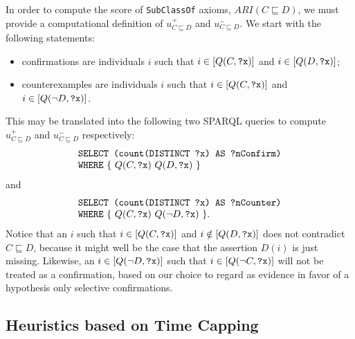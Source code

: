\documentclass{llncs}
\begin{document}
In order to compute the score of \texttt{SubClassOf} axioms, $ARI(C \sqsubseteq D)$, we must provide a computational definition of $u^+_{C \sqsubseteq D}$ and $u^-_{C \sqsubseteq D}$. We start with the following statements:
\begin{itemize}
\item confirmations are individuals $i$ such that
  $i \in [Q(C, \mbox{\tt ?x})]$ and $i \in [Q(D, \mbox{\tt ?x})]$;
\item counterexamples are individuals $i$ such that
  $i \in [Q(C, \mbox{\tt ?x})]$ and $i \in [Q(\neg D, \mbox{\tt ?x})]$.
\end{itemize}
This may be translated into the following two SPARQL queries to compute $u^+_{C \sqsubseteq D}$ and $u^-_{C \sqsubseteq D}$ respectively:
\begin{equation}
  \begin{minipage}[c]{5in}
    \begin{tabbing}
      \quad\=\quad\=\quad\=\kill
      \texttt{SELECT (count(DISTINCT ?x) AS ?nConfirm)}\\
      \texttt{WHERE} \{ $Q(C, \mbox{\tt ?x})$ $Q(D, \mbox{\tt ?x})$ \}
    \end{tabbing}
  \end{minipage}
\end{equation}
and
\begin{equation}
  \begin{minipage}[c]{5in}
    \begin{tabbing}
      \quad\=\quad\=\quad\=\kill
      \texttt{SELECT (count(DISTINCT ?x) AS ?nCounter)}\\
      \texttt{WHERE} \{ $Q(C, \mbox{\tt ?x})$ $Q(\neg D, \mbox{\tt ?x})$ \}.
    \end{tabbing}
  \end{minipage}
\end{equation}
Notice that an $i$ such that $i \in [Q(C, \mbox{\tt ?x})]$ and $i \notin [Q(D, \mbox{\tt ?x})]$
does not contradict $C \sqsubseteq D$, because it might well be the case
that the assertion $D(i)$ is just missing.
Likewise, an $i \in [Q(\neg D, \mbox{\tt ?x})]$ such that $i \in [Q(\neg C, \mbox{\tt ?x})]$
will not be treated as a confirmation, based on our choice to regard as
evidence in favor of a hypothesis only selective confirmations.



\subsection{Heuristics based on Time Capping}
\end{document}
